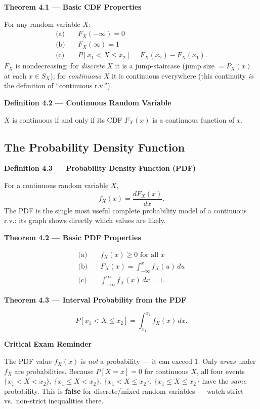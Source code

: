 \documentclass[11pt]{article}
\renewcommand{\P}[1]{P\left[#1\right]}
\newcommand{\topline}[1]{\par\vspace{5pt}\noindent{\color{#1}\rule{\linewidth}{1.1pt}}\par\vspace{3pt}}
\newcommand{\botline}[1]{\par\vspace{2pt}\noindent{\color{#1}\rule{\linewidth}{1.1pt}}\par\vspace{8pt}}
\newenvironment{defbox}[2]{%
  \topline{defcol}\noindent\textbf{\color{defcol}Definition #1 --- #2}\par\smallskip\noindent\ignorespaces
}{\botline{defcol}}
\newenvironment{thmbox}[2]{%
  \topline{thmcol}\noindent\textbf{\color{thmcol}Theorem #1 --- #2}\par\smallskip\noindent\ignorespaces
}{\botline{thmcol}}
\newenvironment{notebox}[1]{%
  \topline{notecol}\noindent\textbf{\color{notecol}#1}\par\smallskip\noindent\ignorespaces
}{\botline{notecol}}
\begin{document}
\begin{thmbox}{4.1}{Basic CDF Properties}
For any random variable $X$:
\begin{align*}
\text{(a)}\quad & F_X(-\infty) = 0 \\
\text{(b)}\quad & F_X(\infty) = 1 \\
\text{(c)}\quad & \P{x_1 < X \le x_2} = F_X(x_2) - F_X(x_1).
\end{align*}
$F_X$ is nondecreasing; for \emph{discrete} $X$ it is a jump-staircase (jump size $=P_X(x)$
at each $x\in S_X$); for \emph{continuous} $X$ it is continuous everywhere (this continuity
\emph{is} the definition of ``continuous r.v.'').
\end{thmbox}

\begin{defbox}{4.2}{Continuous Random Variable}
$X$ is continuous if and only if its CDF $F_X(x)$ is a continuous function of $x$.
\end{defbox}

\subsection{The Probability Density Function}

\begin{defbox}{4.3}{Probability Density Function (PDF)}
For a continuous random variable $X$,
\[ f_X(x) = \frac{dF_X(x)}{dx}. \]
The PDF is the single most useful complete probability model of a continuous r.v.: its graph
shows directly which values are likely.
\end{defbox}

\begin{thmbox}{4.2}{Basic PDF Properties}
\begin{align*}
\text{(a)}\quad & f_X(x)\ge 0 \text{ for all } x \\
\text{(b)}\quad & F_X(x) = \int_{-\infty}^{x} f_X(u)\,du \\
\text{(c)}\quad & \int_{-\infty}^{\infty} f_X(x)\,dx = 1.
\end{align*}
\end{thmbox}

\begin{thmbox}{4.3}{Interval Probability from the PDF}
\[ \P{x_1 < X \le x_2} = \int_{x_1}^{x_2} f_X(x)\,dx. \]
\end{thmbox}

\begin{notebox}{Critical Exam Reminder}
The PDF value $f_X(x)$ is \emph{not} a probability --- it can exceed 1. Only \emph{areas}
under $f_X$ are probabilities. Because $\P{X=x}=0$ for continuous $X$, all four events
$\{x_1{<}X{<}x_2\}$, $\{x_1{\le}X{<}x_2\}$, $\{x_1{<}X{\le}x_2\}$, $\{x_1{\le}X{\le}x_2\}$ have
the \emph{same} probability. This is \textbf{false} for discrete/mixed random variables ---
watch strict vs.\ non-strict inequalities there.
\end{notebox}
\end{document}
